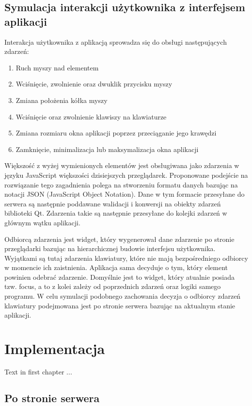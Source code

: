 \documentclass[polish]{inz}
\begin{document}
\section{Symulacja interakcji użytkownika z interfejsem aplikacji}
Interakcja użytkownika z aplikacją sprowadza się do obsługi następujących zdarzeń:
\begin{enumerate}
  \item Ruch myszy nad elementem
  \item Wciśnięcie, zwolnienie oraz dwuklik przycisku myszy
  \item Zmiana położenia kółka myszy
  \item Wciśnięcie oraz zwolnienie klawiszy na klawiaturze
  \item Zmiana rozmiaru okna aplikacji poprzez przeciąganie jego krawędzi
  \item Zamknięcie, minimalizacja lub maksymalizacja okna aplikacji
\end{enumerate}
Większość z wyżej wymienionych elementów jest obsługiwana jako zdarzenia w języku JavaScript większości dzisiejszych przeglądarek. Proponowane podejście na rozwiązanie tego zagadnienia polega na stworzeniu formatu danych bazując na notacji JSON (JavaScript Object Notation). Dane w tym formacie przesyłane do serwera są następnie poddawane walidacji i konwersji na obiekty zdarzeń biblioteki Qt. Zdarzenia takie są następnie przesyłane do kolejki zdarzeń w głównym wątku aplikacji. 

Odbiorcą zdarzenia jest widget, który wygenerował dane zdarzenie po stronie przeglądarki bazując na hierarchicznej budowie interfejsu użytkownika. Wyjątkami są tutaj zdarzenia klawiatury, które nie mają bezpośredniego odbiorcy w momencie ich zaistnienia. Aplikacja sama decyduje o tym, który element powinien odebrać zdarzenie. Domyślnie jest to widget, który atualnie posiada tzw. focus, a to z kolei zależy od poprzednich zdarzeń oraz logiki samego programu. W celu symulacji podobnego zachowania decyzja o odbiorcy zdarzeń klawiatury podejmowana jest po stronie serwera bazując na aktualnym stanie aplikacji.

\chapter{Implementacja}
Text in first chapter ...



\section{Po stronie serwera}
\label{sec:implementation_server}
\end{document}
